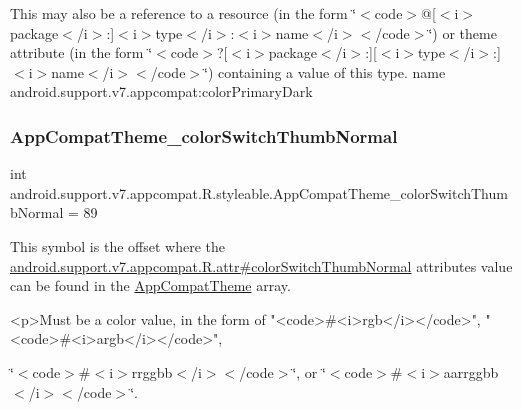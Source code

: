 This may also be a reference to a resource (in the form \char`\"{}$<$code$>$@\mbox{[}$<$i$>$package$<$/i$>$\+:\mbox{]}$<$i$>$type$<$/i$>$\+:$<$i$>$name$<$/i$>$$<$/code$>$\char`\"{}) or theme attribute (in the form \char`\"{}$<$code$>$?\mbox{[}$<$i$>$package$<$/i$>$\+:\mbox{]}\mbox{[}$<$i$>$type$<$/i$>$\+:\mbox{]}$<$i$>$name$<$/i$>$$<$/code$>$\char`\"{}) containing a value of this type.  name android.\+support.\+v7.\+appcompat\+:color\+Primary\+Dark \mbox{\label{classandroid_1_1support_1_1v7_1_1appcompat_1_1R_1_1styleable_a879b8157b7dcefca9179aa3158069301}} 
\subsubsection{\texorpdfstring{App\+Compat\+Theme\+\_\+color\+Switch\+Thumb\+Normal}{AppCompatTheme\_colorSwitchThumbNormal}}
{\footnotesize\ttfamily int android.\+support.\+v7.\+appcompat.\+R.\+styleable.\+App\+Compat\+Theme\+\_\+color\+Switch\+Thumb\+Normal = 89\hspace{0.3cm}{\ttfamily [static]}}

This symbol is the offset where the \hyperlink{classandroid_1_1support_1_1v7_1_1appcompat_1_1R_1_1attr_a4db6b3cd94eafb766c1d4a6c42239dc5}{android.\+support.\+v7.\+appcompat.\+R.\+attr\#color\+Switch\+Thumb\+Normal} attribute\textquotesingle{}s value can be found in the \hyperlink{classandroid_1_1support_1_1v7_1_1appcompat_1_1R_1_1styleable_a5c42f89e8a410c323be34208d75c430b}{App\+Compat\+Theme} array.

\begin{DoxyVerb}      <p>Must be a color value, in the form of "<code>#<i>rgb</i></code>", "<code>#<i>argb</i></code>",
\end{DoxyVerb}
 \char`\"{}$<$code$>$\#$<$i$>$rrggbb$<$/i$>$$<$/code$>$\char`\"{}, or \char`\"{}$<$code$>$\#$<$i$>$aarrggbb$<$/i$>$$<$/code$>$\char`\"{}. 

